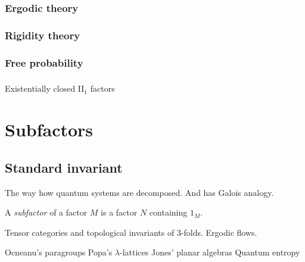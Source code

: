 \documentclass{../../large}
\begin{document}
\section{Ergodic theory}
\section{Rigidity theory}
\section{Free probability}
\section{}
Existentially closed II$_1$ factors






\part{Subfactors}


\chapter{Standard invariant}

The way how quantum systems are decomposed.
And has Galois analogy.

\begin{prb}
A \emph{subfactor} of a factor $M$ is a factor $N$ containing $1_M$.
\end{prb}

Tensor categories and topological invariants of 3-folds.
Ergodic flows.


Ocneanu's paragroups
Popa's $\lambda$-lattices
Jones' planar algebras
Quantum entropy
\end{document}
